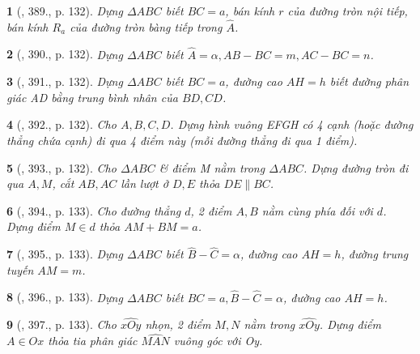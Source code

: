 \documentclass{article}
\newtheorem{baitoan}{}
\begin{document}
\begin{baitoan}[\cite{Binh_Toan_9_tap_2}, 389., p. 132]
	Dựng $\Delta ABC$ biết $BC = a$, bán kính $r$ của đường tròn nội tiếp, bán kính $R_a$ của đường tròn bàng tiếp trong $\widehat{A}$.
\end{baitoan}

\begin{baitoan}[\cite{Binh_Toan_9_tap_2}, 390., p. 132]
	Dựng $\Delta ABC$ biết $\widehat{A} = \alpha,AB - BC = m,AC - BC = n$.
\end{baitoan}

\begin{baitoan}[\cite{Binh_Toan_9_tap_2}, 391., p. 132]
	Dựng $\Delta ABC$ biết $BC = a$, đường cao $AH = h$ biết đường phân giác AD bằng trung bình nhân của $BD,CD$.
\end{baitoan}

\begin{baitoan}[\cite{Binh_Toan_9_tap_2}, 392., p. 132]
	Cho $A,B,C,D$. Dựng hình vuông EFGH có 4 cạnh (hoặc đường thẳng chứa cạnh) đi qua 4 điểm này (mỗi đường thẳng đi qua 1 điểm).
\end{baitoan}

\begin{baitoan}[\cite{Binh_Toan_9_tap_2}, 393., p. 132]
	Cho $\Delta ABC$ \& điểm M nằm trong $\Delta ABC$. Dựng đường tròn đi qua $A,M$, cắt $AB,AC$ lần lượt ở $D,E$ thỏa $DE\parallel BC$.
\end{baitoan}

\begin{baitoan}[\cite{Binh_Toan_9_tap_2}, 394., p. 133]
	Cho đường thẳng $d$, 2 điểm $A,B$ nằm cùng phía đối với $d$. Dựng điểm $M\in d$ thỏa $AM + BM = a$.
\end{baitoan}

\begin{baitoan}[\cite{Binh_Toan_9_tap_2}, 395., p. 133]
	Dựng $\Delta ABC$ biết $\widehat{B} - \widehat{C} = \alpha$, đường cao $AH = h$, đường trung tuyến $AM = m$.
\end{baitoan}

\begin{baitoan}[\cite{Binh_Toan_9_tap_2}, 396., p. 133]
	Dựng $\Delta ABC$ biết $BC = a,\widehat{B} - \widehat{C} = \alpha$, đường cao $AH = h$.
\end{baitoan}

\begin{baitoan}[\cite{Binh_Toan_9_tap_2}, 397., p. 133]
	Cho $\widehat{xOy}$ nhọn, 2 điểm $M,N$ nằm trong $\widehat{xOy}$. Dựng điểm $A\in Ox$ thỏa tia phân giác $\widehat{MAN}$ vuông góc với Oy.
\end{baitoan}
\end{document}
